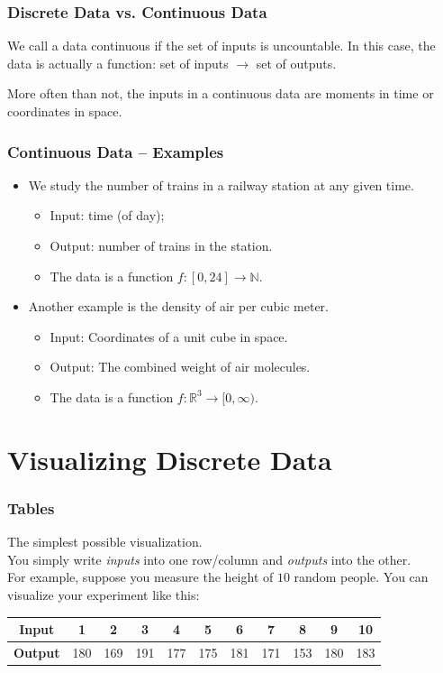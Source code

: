 \documentclass[aspectratio=169,11pt,svgnames,handout]{beamer}
\begin{document}
\begin{frame}
 \frametitle{Discrete Data vs. Continuous Data}
 \begin{tcolorbox}[title=Continuous Data]
  We call a data \alert{continuous} if the set of inputs is \alert{uncountable}.
  In this case, the data is actually a \alert{function}: set of inputs $ \to $
  set of outputs.
 \end{tcolorbox}
 \pause
 More often than not, the inputs in a continuous data are \alert{moments in
 time} or \alert{coordinates in space}.
\end{frame}

\begin{frame}
 \frametitle{Continuous Data -- Examples}
 \begin{itemize}[label=\textbullet]
  \item We study the number of trains in a railway station at any given time.
  \pause
  \begin{itemize}[label=\textminus]
   \item Input: time (of day);
   \pause
   \item Output: number of trains in the station.
   \pause
   \item The data is a function $f:[0,24] \to \mathbb{N}$.
  \end{itemize}
 \pause
 \item Another example is the density of air per cubic meter.
 \pause
 \begin{itemize}[label=\textminus] 
  \item Input: Coordinates of a unit cube in space.
  \pause
  \item Output: The combined weight of air molecules.
  \pause
  \item The data is a function $f:\mathbb{R}^3 \to [0,\infty)$. 
 \end{itemize}
 \end{itemize}
\end{frame}

\section{Visualizing Discrete Data}

\begin{frame}
 \frametitle{Tables}
 The simplest possible visualization.\\
 \pause
 You simply write \emph{inputs} into one row/column and \emph{outputs} into the
 other.\\
 \pause
 For example, suppose you measure the height of $10$ random people. You can
 visualize your experiment like this:
 \pause
 \begin{center}
  \begin{tabular}{c|cccccccccc}
   \textbf{Input} & 1 & 2 & 3 & 4 & 5 & 6 & 7 & 8 & 9 & 10\\
   \midrule
   \textbf{Output} & 180 & 169 & 191 & 177 & 175 & 181 & 171 & 153 & 180 & 183
  \end{tabular}
 \end{center}
\end{frame}
\end{document}
